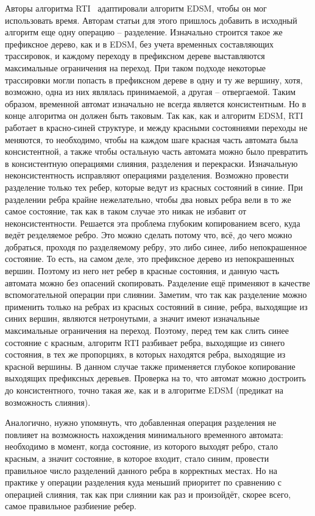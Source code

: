 \documentclass[times,specification,annotation]{itmo-student-thesis}
\begin{document}
Авторы алгоритма RTI~\cite{rti} адаптировали алгоритм EDSM, чтобы он мог использовать время. Авторам статьи для этого пришлось добавить в исходный алгоритм еще одну операцию -- разделение.
Изначально строится такое же префиксное дерево, как и в EDSM, без учета временных составляющих трассировок, и каждому переходу в префиксном дереве выставляются максимальные ограничения на переход.
При таком подходе некоторые трассировки могли попасть в префиксном дереве в одну и ту же вершину, хотя, возможно, одна из них являлась принимаемой, а другая -- отвергаемой. Таким образом, временной
автомат изначально не всегда является консистентным. Но в конце алгоритма он должен быть таковым. Так как, как и алгоритм EDSM, RTI работает в красно-синей структуре, и между красными состояниями
переходы не меняются, то необходимо, чтобы на каждом шаге красная часть автомата была консистентной, а также чтобы остальную часть автомата можно было превратить в консистентную
операциями слияния, разделения и перекраски. Изначальную неконсистентность исправляют операциями разделения. Возможно провести разделение только тех ребер, которые ведут из красных состояний в синие. 
При разделении ребра крайне нежелательно, чтобы два новых ребра вели в то же самое состояние, так как в таком случае это никак не избавит от неконсистентности.
Решается эта проблема глубоким копированием всего, куда ведёт резделяемое ребро. Это можно сделать потому что, всё, до чего можно добраться, проходя по разделяемому ребру, это либо синее, либо
непокрашенное состояние. То есть, на самом деле, это префиксное дерево из непокрашенных вершин. Поэтому из него нет ребер в красные состояния, и данную часть автомата можно без опасений скопировать.
Разделение ещё применяют в качестве вспомогательной операции при слиянии. Заметим, что так как разделение можно применить только на ребрах из красных состояний в синие, ребра, выходящие из синих
вершин, являются нетронутыми, а значит имеют изначальные максимальные ограничения на переход. Поэтому, перед тем как слить синее состояние с красным, алгоритм RTI разбивает ребра, 
выходящие из синего состояния, в тех же пропорциях, в которых находятся ребра, выходящие из красной вершины. В данном случае также применяется глубокое копирование выходящих префиксных деревьев.
Проверка на то, что автомат можно достроить до консистентного, точно такая же, как и в алгоритме EDSM (предикат на возможность слияния).

Аналогично, нужно упомянуть, что добавленная операция разделения не повлияет на возможность нахождения минимального временного автомата: необходимо в момент, когда состояние, из которого
выходят ребро, стало красным, а значит состояние, в которое входит, стало синим, провести правильное число разделений данного ребра в корректных местах. Но на практике у операции
разделения куда меньший приоритет по сравнению с операцией слияния, так как при слиянии как раз и произойдёт, скорее всего, самое правильное разбиение ребер. 
\end{document}
